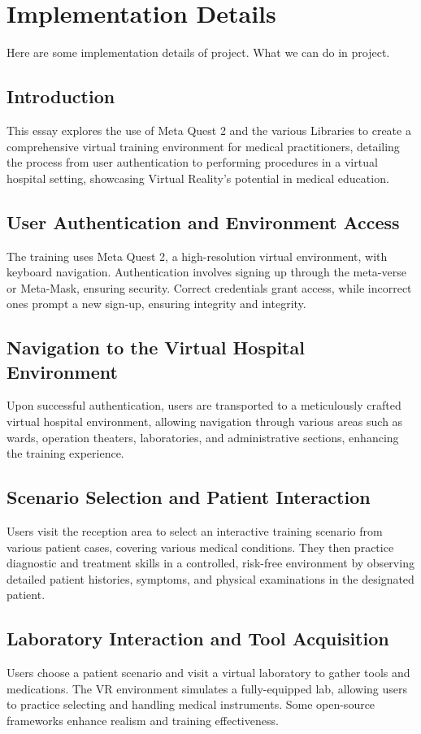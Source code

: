 \chapter{Implementation Details}
\label{ch:implementation}
{Here are some implementation details of project. What we can do in project.}
\section{Introduction}
This essay explores the use of Meta Quest 2 and the various Libraries to create a comprehensive virtual training environment for medical practitioners, detailing the process from user authentication to performing procedures in a virtual hospital setting, showcasing Virtual Reality's potential in medical education.

\section{User Authentication and Environment Access}
The training uses Meta Quest 2, a high-resolution virtual environment, with keyboard navigation. Authentication involves signing up through the meta-verse or Meta-Mask, ensuring security. Correct credentials grant access, while incorrect ones prompt a new sign-up, ensuring integrity and integrity.
\section{Navigation to the Virtual Hospital Environment}
Upon successful authentication, users are transported to a meticulously crafted virtual hospital environment, allowing navigation through various areas such as wards, operation theaters, laboratories, and administrative sections, enhancing the training experience.

\section{Scenario Selection and Patient Interaction}
Users visit the reception area to select an interactive training scenario from various patient cases, covering various medical conditions. They then practice diagnostic and treatment skills in a controlled, risk-free environment by observing detailed patient histories, symptoms, and physical examinations in the designated patient.
\section{Laboratory Interaction and Tool Acquisition}
Users choose a patient scenario and visit a virtual laboratory to gather tools and medications. The VR environment simulates a fully-equipped lab, allowing users to practice selecting and handling medical instruments. Some open-source frameworks enhance realism and training effectiveness.
